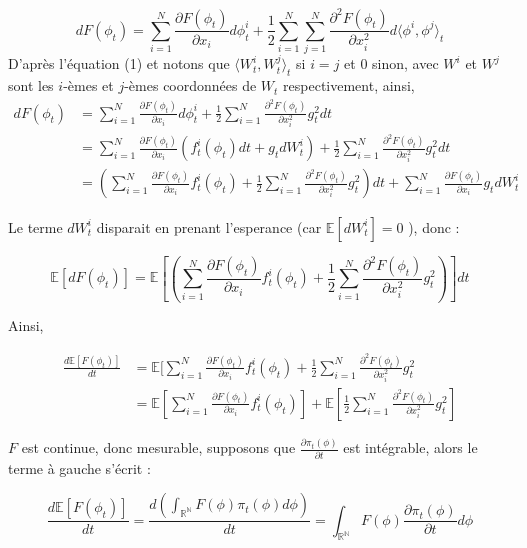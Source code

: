 \documentclass{article}
\theoremstyle{definition} %
\theoremstyle{definition} %
\theoremstyle{definition} %
\theoremstyle{definition} %
\begin{document}
    \[dF(\phi_t) = \sum_{i=1}^N \frac{\partial F(\phi_t)}{\partial x_i} d\phi_t^i + \frac{1}{2} \sum_{i=1}^N \sum_{j=1}^N \frac{\partial^2 F(\phi_t)}{\partial x_i^2}d\langle \phi^i,\phi^j\rangle_t\]
D'après l'équation (1) et notons que $\langle W_t^i, W_t^j \rangle_t$ si $i = j$ et $0$ sinon, avec $W^i$ et $W^j$ sont les $i$-èmes et $j$-èmes coordonnées de $W_t$ respectivement, ainsi,
\begin{align*}
    dF(\phi_t) &= \sum_{i=1}^N \frac{\partial F(\phi_t)}{\partial x_i} d\phi_t^i + \frac{1}{2} \sum_{i=1}^N  \frac{\partial^2 F(\phi_t)}{\partial x_i^2} g_t^2 dt \\
    &= \sum_{i=1}^N \frac{\partial F(\phi_t)}{\partial x_i} (f^i_t(\phi_t)dt + g_tdW^i_t) + \frac{1}{2} \sum_{i=1}^N  \frac{\partial^2 F(\phi_t)}{\partial x_i^2} g_t^2 dt \\
    &= (\sum_{i=1}^N \frac{\partial F(\phi_t)}{\partial x_i} f^i_t(\phi_t) + \frac{1}{2} \sum_{i=1}^N  \frac{\partial^2 F(\phi_t)}{\partial x_i^2} g_t^2)dt + \sum_{i=1}^N \frac{\partial F(\phi_t)}{\partial x_i}  g_tdW^i_t
\end{align*}

Le terme $dW_t^i$ disparait en prenant l'esperance  (car $\mathbb{E}[dW_t^i] = 0$ ), donc :

\[\mathbb{E}[dF(\phi_t)] = \mathbb{E}[(\sum_{i=1}^N \frac{\partial F(\phi_t)}{\partial x_i} f^i_t(\phi_t) + \frac{1}{2} \sum_{i=1}^N \frac{\partial^2 F(\phi_t)}{\partial x_i^2} g_t^2)] dt\]

Ainsi,

\begin{align}
    \frac{d\mathbb{E}[F(\phi_t)]}{dt} &= \mathbb{E}[\sum_{i=1}^N \frac{\partial F(\phi_t)}{\partial x_i} f^i_t(\phi_t) + \frac{1}{2} \sum_{i=1}^N  \frac{\partial^2 F(\phi_t)}{\partial x_i^2}g_t^2 \\
    &=\mathbb{E}[\sum_{i=1}^N \frac{\partial F(\phi_t)}{\partial x_i} f^i_t(\phi_t)] + \mathbb{E}[\frac{1}{2} \sum_{i=1}^N  \frac{\partial^2 F(\phi_t)}{\partial x_i^2} g_t^2]
\end{align}

$F$ est continue, donc mesurable, supposons que $\frac{\partial\pi_t(\phi)}{\partial t}$ est intégrable, alors le terme à gauche s'écrit :

\[\frac{d\mathbb{E}[F(\phi_t)]}{dt} = \frac{d (\int_{\mathbb{R^N}} F(\phi) \pi_t(\phi) d\phi)} {dt} = \int_{\mathbb{R^N}}F(\phi)\frac{\partial\pi_t(\phi)}{\partial t} d\phi\]
\end{document}
